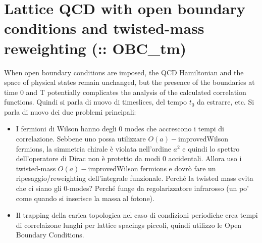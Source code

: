 \documentclass[12pt,a4paper,openright]{article}
\newcommand{\oai}{$O(a)-$improved}
\newcommand{\obc}{Open Boundary Conditions}
\begin{document}
\newpage

\section{Lattice QCD with open boundary conditions and twisted-mass reweighting (:: OBC\_tm)}
When open boundary conditions are imposed, the QCD Hamiltonian and the space
of physical states remain unchanged, but the presence of the boundaries at time 0
and T potentially complicates the analysis of the calculated correlation functions.
Quindi si parla di nuovo di timeslices, del tempo $t_0$ da estrarre, etc.
\newline\newline
Si parla di nuovo dei due problemi principali:
\begin{itemize}
  \item I fermioni di Wilson hanno degli 0 modes che accrescono i tempi di correlazione.
        Sebbene uno possa utilizzare \oai Wilson fermions, la simmetria chirale è violata nell'ordine $a^2$ e quindi lo spettro dell'operatore di Dirac non è protetto da modi 0 accidentali.
        Allora uso i twisted-mass \oai Wilson fermions e dovrò fare un ripesaggio/reweighting dell'integrale funzionale. Perché la twisted mass evita che ci siano gli 0-modes? Perché funge da regolarizzatore infrarosso (un po' come quando si inserisce la massa al fotone).
  \item Il trapping della carica topologica nel caso di condizioni periodiche crea tempi di correlaizone lunghi per lattice spacings piccoli, quindi utilizzo le \obc.
\end{itemize}
\end{document}
